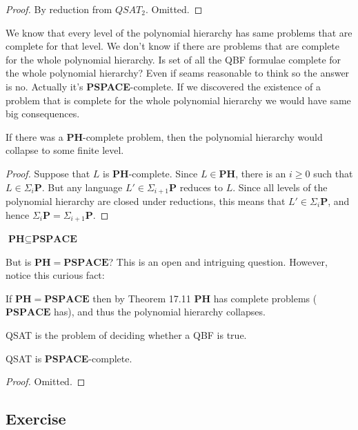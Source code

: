 \begin{proof}
    By reduction from $QSAT_2$. Omitted.
\end{proof}
We know that every level of the polynomial hierarchy has same problems that are complete for that level. We don't know if there are problems that are complete for the whole polynomial hierarchy. Is set of all the QBF formulae complete for the whole polynomial hierarchy? Even if seams reasonable to think so the answer is no. Actually it's \textbf{PSPACE}-complete. If we discovered the existence of a problem that is complete for the whole polynomial hierarchy we would have same big consequences.
\begin{defbox}[Theorem 17.11]
    If there was a \textbf{PH}-complete problem, then the polynomial hierarchy would collapse to some finite level.
\end{defbox}
\begin{proof}
Suppose that $L$ is \textbf{PH}-complete. Since $L \in \textbf{PH}$, there is an $i \geq 0$ such that $L \in \Sigma_i\mathbf{P}$. But any language $L' \in \Sigma_{i+1}\mathbf{P}$ reduces to $L$. Since all levels of the polynomial hierarchy are closed under reductions, this means that $L' \in \Sigma_i\mathbf{P}$, and hence $\Sigma_i\mathbf{P} = \Sigma_{i+1}\mathbf{P}$.
\end{proof}
\begin{defbox}[Proposition]
    $\textbf{PH}\subseteq\textbf{PSPACE}$
\end{defbox}
But is $\mathbf{PH} = \mathbf{PSPACE}$? This is an open and intriguing question. However, notice this curious fact:
\begin{defbox}[Corollary]
 If $\mathbf{PH} = \mathbf{PSPACE}$ then by Theorem 17.11 $\mathbf{PH}$ has complete problems ($\mathbf{PSPACE}$ has), and thus the polynomial hierarchy collapses.
\end{defbox}
\begin{defbox}[Definition]
    QSAT is the problem of deciding whether a QBF is true. 
\end{defbox}
\begin{defbox}[Theorem]
    QSAT is \textbf{PSPACE}-complete.
\end{defbox}
\begin{proof}
    Omitted.
\end{proof}

\subsection{Exercise}
